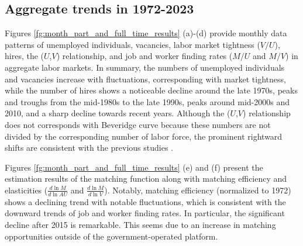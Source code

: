 \documentclass[12pt]{article}
\begin{document}
\subsection{Aggregate trends in 1972-2023}\label{sec:month_level}

Figures \ref{fg:month_part_and_full_time_results} (a)-(d) provide monthly data patterns of unemployed individuals, vacancies, labor market tightness (\(V/U\)), hires, the  ($U$,$V$) relationship, and job and worker finding rates (\(M/U\) and \(M/V\)) in aggregate labor markets. 
In summary, the numbers of unemployed individuals and vacancies increase with fluctuations, corresponding with market tightness, while the number of hires shows a noticeable decline around the late 1970s, peaks and troughs from the mid-1980s to the late 1990s, peaks around mid-2000s and 2010, and a sharp decline towards recent years.
Although the ($U$,$V$) relationship does not corresponds with Beveridge curve because these numbers are not divided by the corresponding number of labor force, the prominent rightward shifts are consistent with the previous studies \citep{elsby2015beveridge}.

Figures \ref{fg:month_part_and_full_time_results} (e) and (f) present the estimation results of the matching function along with matching efficiency and elasticities (\(\frac{d\ln M}{d\ln AU}\) and \(\frac{d\ln M}{d\ln V}\)). Notably, matching efficiency (normalized to 1972) shows a declining trend with notable fluctuations, which is consistent with the downward trends of job and worker finding rates. 
In particular, the significant decline after 2015 is remarkable.
This seems due to an increase in matching opportunities outside of the government-operated platform.
\end{document}

